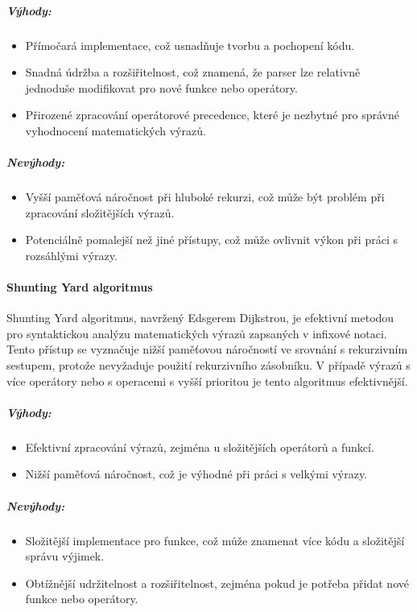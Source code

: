 \documentclass[12pt]{article} %
\begin{document}
\subparagraph{Výhody:}
\begin{itemize}
    \item Přímočará implementace, což usnadňuje tvorbu a pochopení kódu.
    \item Snadná údržba a rozšiřitelnost, což znamená, že parser lze relativně jednoduše modifikovat pro nové funkce nebo operátory.
    \item Přirozené zpracování operátorové precedence, které je nezbytné pro správné vyhodnocení matematických výrazů.
\end{itemize}

\subparagraph{Nevýhody:}
\begin{itemize}
    \item Vyšší paměťová náročnost při hluboké rekurzi, což může být problém při zpracování složitějších výrazů.
    \item Potenciálně pomalejší než jiné přístupy, což může ovlivnit výkon při práci s rozsáhlými výrazy.
\end{itemize}

\paragraph{Shunting Yard algoritmus}

Shunting Yard algoritmus, navržený Edsgerem Dijkstrou, je efektivní metodou pro syntaktickou analýzu matematických výrazů zapsaných v infixové notaci. Tento přístup se vyznačuje nižší paměťovou náročností ve srovnání s rekurzivním sestupem, protože nevyžaduje použití rekurzivního zásobníku. V případě výrazů s více operátory nebo s operacemi s vyšší prioritou je tento algoritmus efektivnější.

\subparagraph{Výhody:}
\begin{itemize}
    \item Efektivní zpracování výrazů, zejména u složitějších operátorů a funkcí.
    \item Nižší paměťová náročnost, což je výhodné při práci s velkými výrazy.
\end{itemize}

\subparagraph{Nevýhody:}
\begin{itemize}
    \item Složitější implementace pro funkce, což může znamenat více kódu a složitější správu výjimek.
    \item Obtížnější udržitelnost a rozšiřitelnost, zejména pokud je potřeba přidat nové funkce nebo operátory.
\end{itemize}
\end{document}
